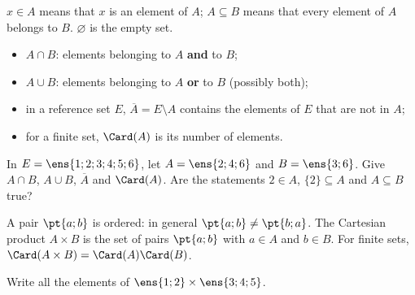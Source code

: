 \begin{keypoint}
$x\in A$ means that $x$ is an element of $A$; $A\subseteq B$ means that every element of $A$ belongs to $B$. $\varnothing$ is the empty set.
\begin{itemize}
\item $A\cap B$: elements belonging to $A$ \textbf{and} to $B$;
\item $A\cup B$: elements belonging to $A$ \textbf{or} to $B$ (possibly both);
\item in a reference set $E$, $\overline A=E\setminus A$ contains the elements of $E$ that are not in $A$;
\item for a finite set, $\Card(A)$ is its number of elements.
\end{itemize}
\end{keypoint}
\begin{example}In $E=\ens{1;2;3;4;5;6}$, let $A=\ens{2;4;6}$ and $B=\ens{3;6}$. Give $A\cap B$, $A\cup B$, $\overline A$ and $\Card(A)$. Are the statements $2\in A$, $\{2\}\subseteq A$ and $A\subseteq B$ true?\end{example}
\begin{keypoint}
A pair $\pt{a;b}$ is ordered: in general $\pt{a;b}\ne\pt{b;a}$. The Cartesian product $A\times B$ is the set of pairs $\pt{a;b}$ with $a\in A$ and $b\in B$. For finite sets, $\Card(A\times B)=\Card(A)\Card(B)$.
\end{keypoint}
\begin{example}Write all the elements of $\ens{1;2}\times\ens{3;4;5}$.\end{example}


